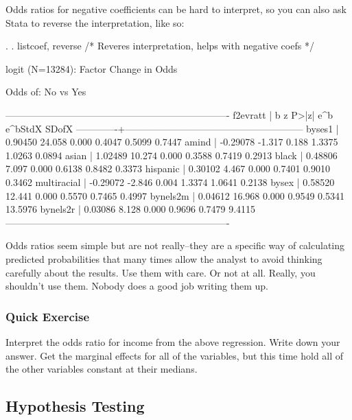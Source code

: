 \documentclass[12pt]{article}
\begin{document}
Odds ratios for negative coefficients can be hard to interpret, so you
can also ask Stata to reverse the interpretation, like so: 

\begin{stlog}
  
.
. listcoef, reverse /* Reveres interpretation, helps with negative coefs */

logit (N=13284): Factor Change in Odds 

  Odds of: No vs Yes

----------------------------------------------------------------------
    f2evratt |      b         z     P>|z|    e^b    e^bStdX      SDofX
-------------+--------------------------------------------------------
      byses1 |   0.90450   24.058   0.000   0.4047   0.5099     0.7447
       amind |  -0.29078   -1.317   0.188   1.3375   1.0263     0.0894
       asian |   1.02489   10.274   0.000   0.3588   0.7419     0.2913
       black |   0.48806    7.097   0.000   0.6138   0.8482     0.3373
    hispanic |   0.30102    4.467   0.000   0.7401   0.9010     0.3462
 multiracial |  -0.29072   -2.846   0.004   1.3374   1.0641     0.2138
       bysex |   0.58520   12.441   0.000   0.5570   0.7465     0.4997
    bynels2m |   0.04612   16.968   0.000   0.9549   0.5341    13.5976
    bynels2r |   0.03086    8.128   0.000   0.9696   0.7479     9.4115
----------------------------------------------------------------------

\end{stlog}


Odds ratios seem simple but are not really--they are a specific way of
calculating predicted probabilities that many times allow the analyst
to avoid thinking carefully about the results. Use them with care. Or
not at all. Really, you shouldn't use them. Nobody does a good job
writing them up. 


\subsubsection{Quick Exercise}

Interpret the odds ratio for income from the above regression. Write
down your answer. Get the marginal effects for all of the variables, but this time hold all of
the other variables constant at their medians. 


\subsection{Hypothesis Testing}
\end{document}

